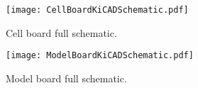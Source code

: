 \section{}\label{sec:KiCADSchematics}
\FloatBarrier
\begin{figure}[h!]
    \centering
    \texttt{[image: CellBoardKiCADSchematic.pdf]}
    \caption{Cell board full schematic.}
    \label{fig:CellBoardKiCADSchematic}
\end{figure}

\begin{figure}[h!]
    \centering
    \texttt{[image: ModelBoardKiCADSchematic.pdf]}
    \caption{Model board full schematic.}
    \label{fig:ModelBoardKiCADSchematic}
\end{figure}
\FloatBarrier